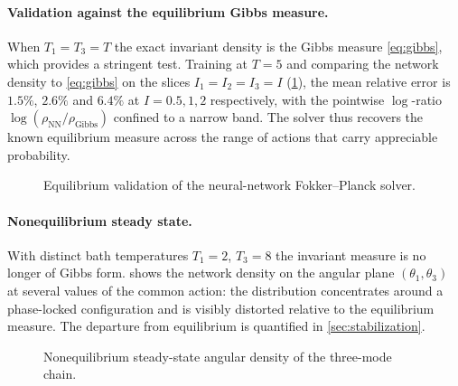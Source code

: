 \documentclass[11pt,a4paper]{article}
\theoremstyle{definition}
\numberwithin{equation}{section}   %
\begin{document}
\paragraph{Validation against the equilibrium Gibbs measure.}
When $T_1=T_3=T$ the exact invariant density is the Gibbs measure
\eqref{eq:gibbs}, which provides a stringent test. Training at $T=5$ and
comparing the network density to \eqref{eq:gibbs} on the slices $I_1=I_2=I_3=I$
(\cref{fig:eq-validation}), the mean relative error is $1.5\%$, $2.6\%$ and
$6.4\%$ at $I=0.5,1,2$ respectively, with the pointwise $\log$-ratio
$\log(\rho_{\mathrm{NN}}/\rho_{\mathrm{Gibbs}})$ confined to a narrow band. The
solver thus recovers the known equilibrium measure across the range of actions
that carry appreciable probability.

\begin{figure}[ht]
  \centering
  \caption{Equilibrium validation of the neural-network Fokker--Planck solver.}
  \label{fig:eq-validation}
\end{figure}

\paragraph{Nonequilibrium steady state.}
With distinct bath temperatures $T_1=2$, $T_3=8$ the invariant measure is no
longer of Gibbs form.  shows the network density on the
angular plane $(\theta_1,\theta_3)$ at several values of the common action: the
distribution concentrates around a phase-locked configuration and is visibly
distorted relative to the equilibrium measure. The departure from equilibrium
is quantified in \cref{sec:stabilization}.

\begin{figure}[ht]
  \centering
  \caption{Nonequilibrium steady-state angular density of the three-mode chain.}
  \label{fig:neq-density}
\end{figure}
\end{document}

